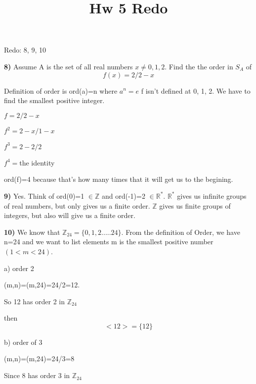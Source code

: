\documentclass{article}
\title{Hw 5 Redo}
\date{}
\begin{document}
\maketitle

Redo: 8, 9, 10

\medskip



\textbf{8)} 	Assume A is the set of all real numbers $x \neq 0, 1, 2$.  
Find the the order in $S_A$ of 
$$f(x)=2/2-x$$

Definition of order is ord(a)=n where $a^{n}=e$
f isn't defined at 0, 1, 2.  We have to find the smallest positive integer. 

\medskip

$f=2/2-x$

$f^{2}=2-x/1-x$

\medskip

$f^{3}=2-2/2$

\medskip

$f^{4}=$the identity 

\medskip

ord(f)=4 because that's how many times that it will get us to the begining. 



\newpage

\newpage
\textbf{9)} Yes. Think of ord(0)=1 $\in \mathbb{Z}$ and ord(-1)=2 $\in \mathbb{R^{*}}$. $\mathbb{R^{*}}$ gives us infinite groups of real numbers, but only gives us a finite order. $\mathbb{Z}$ gives us finite groups of integers, but also will give us a finite order. 
 

 
 

\newpage
 
 
 \textbf{10)}  We know that $\mathbb{Z}_{24}=\{0,1,2.....24\}$. From the definition of Order, we have n=24 and we want to list elements m is the smallest positive number $(1<m<24)$.

\medskip

a) order 2
\medskip

(m,n)=(m,24)=24/2=12.
\medskip

So 12 has order 2 in $\mathbb{Z}_{24} $
\medskip

then $$<12>=\{12\}$$
\medskip


b) order of 3
\medskip

(m,n)=(m,24)=24/3=8
\medskip

Since 8 has order 3 in $\mathbb{Z}_{24}$
\medskip
\end{document}
